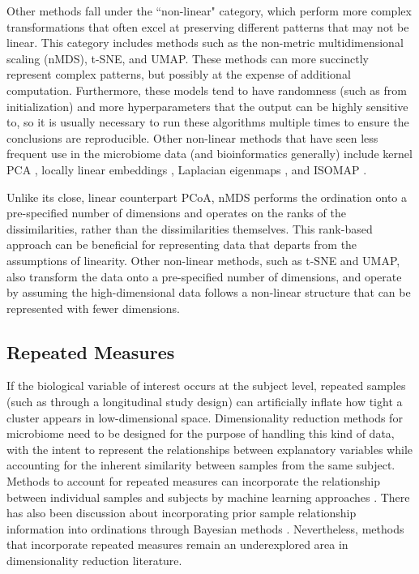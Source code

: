 Other methods fall under the ``non-linear" category, which perform more complex transformations that often excel at preserving different patterns that may not be linear. This category includes methods such as the non-metric multidimensional scaling (nMDS), t-SNE, and UMAP. These methods can more succinctly represent complex patterns, but possibly at the expense of additional computation. Furthermore, these models tend to have randomness (such as from initialization) and more hyperparameters that the output can be highly sensitive to, so it is usually necessary to run these algorithms multiple times to ensure the conclusions are reproducible. Other non-linear methods that have seen less frequent use in the microbiome data (and bioinformatics generally) include kernel PCA \cite{Scholkopf1999-nw}, locally linear embeddings \cite{Roweis2000-jp}, Laplacian eigenmaps \cite{Belkin2001-ip}, and ISOMAP \cite{Tenenbaum2000-dy}.

Unlike its close, linear counterpart PCoA, nMDS performs the ordination onto a pre-specified number of dimensions and operates on the ranks of the dissimilarities, rather than the dissimilarities themselves. This rank-based approach can be beneficial for representing data that departs from the assumptions of linearity. Other non-linear methods, such as t-SNE and UMAP, also transform the data onto a pre-specified number of dimensions, and operate by assuming the high-dimensional data follows a non-linear structure that can be represented with fewer dimensions. 

\subsection{Repeated Measures} If the biological variable of interest occurs at the subject level, repeated samples (such as through a longitudinal study design) can artificially inflate how tight a cluster appears in low-dimensional space. Dimensionality reduction methods for microbiome need to be designed for the purpose of handling this kind of data, with the intent to represent the relationships between explanatory variables while accounting for the inherent similarity between samples from the same subject. Methods to account for repeated measures can incorporate the relationship between individual samples and subjects by machine learning approaches \cite{Martino2021-wa}. There has also been discussion about incorporating prior sample relationship information into ordinations through Bayesian methods \cite{Ren2017-pu}. Nevertheless, methods that incorporate repeated measures remain an underexplored area in dimensionality reduction literature.

